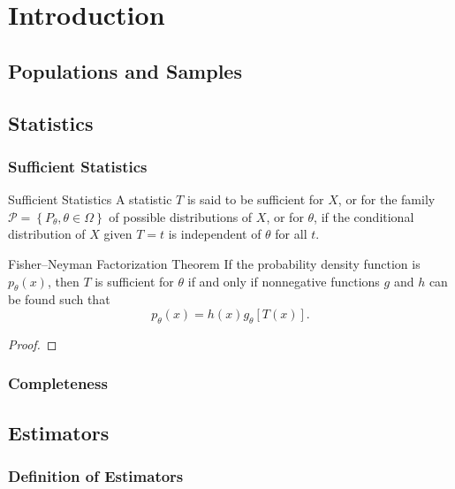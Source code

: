 \chapter{Introduction}

\section{Populations and Samples}

\section{Statistics}

\subsection{Sufficient Statistics}

\begin{definition}{Sufficient Statistics}{}
    A statistic $T$ is said to be sufficient for $X$, or for the family $\mathcal{P}=\left\{P_{\theta}, \theta \in \Omega\right\}$ of possible distributions of $X$, or for $\theta$, if the conditional distribution of $X$ given $T=t$ is independent of $\theta$ for all $t$.
\end{definition}

\begin{theorem}{Fisher–Neyman Factorization Theorem}{}
    If the probability density function is $p_{\theta}(x)$, then $T$ is sufficient for $\theta$ if and only if nonnegative functions $g$ and $h$ can be found such that
    \begin{equation*}
        p_{\theta}(x)=h(x)g_{\theta}[T(x)].
    \end{equation*}
\end{theorem}

\begin{proof}
    
\end{proof}

\subsection{Completeness}

\section{Estimators}

\subsection{Definition of Estimators}

